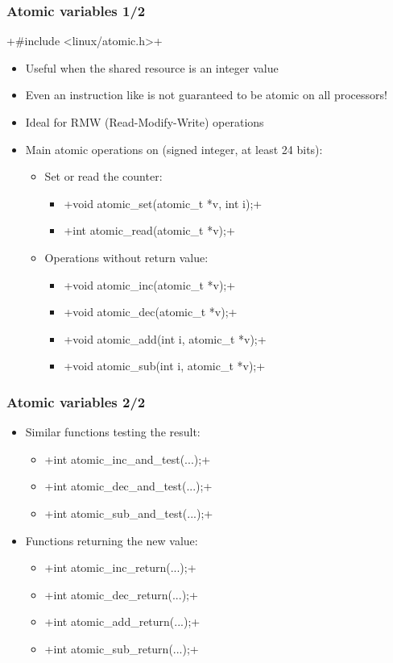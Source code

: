 \begin{frame}[fragile]
  \frametitle{Atomic variables 1/2}
  +#include <linux/atomic.h>+
  \begin{itemize}
  \item Useful when the shared resource is an integer value
  \item Even an instruction like  is not guaranteed to be
    atomic on all processors!
  \item Ideal for RMW (Read-Modify-Write) operations
  \item Main atomic operations on  (signed integer, at
    least 24 bits):
    \begin{itemize}
    \item Set or read the counter:
      \begin{itemize}
      \item {}+void atomic_set(atomic_t *v, int i);+
      \item {}+int atomic_read(atomic_t *v);+
      \end{itemize}
    \item Operations without return value:
      \begin{itemize}
      \item {}+void atomic_inc(atomic_t *v);+
      \item {}+void atomic_dec(atomic_t *v);+
      \item {}+void atomic_add(int i, atomic_t *v);+
      \item {}+void atomic_sub(int i, atomic_t *v);+
      \end{itemize}
    \end{itemize}
  \end{itemize}
\end{frame}

\begin{frame}[fragile]
  \frametitle{Atomic variables 2/2}
  \begin{itemize}
  \item Similar functions testing the result:
    \begin{itemize}
    \item {}+int atomic_inc_and_test(...);+
    \item {}+int atomic_dec_and_test(...);+
    \item {}+int atomic_sub_and_test(...);+
    \end{itemize}
  \item Functions returning the new value:
    \begin{itemize}
    \item {}+int atomic_inc_return(...);+
    \item {}+int atomic_dec_return(...);+
    \item {}+int atomic_add_return(...);+
    \item {}+int atomic_sub_return(...);+
    \end{itemize}
  \end{itemize}
\end{frame}


